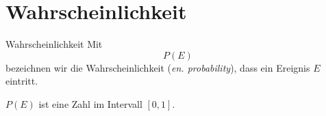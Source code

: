 
\section{Wahrscheinlichkeit}
\begin{definition}{Wahrscheinlichkeit}{}
Mit $$P(E)$$ bezeichnen wir die Wahrscheinlichkeit (\textit{en. probability}), dass ein Ereignis $E$ eintritt.

$P(E)$ ist eine Zahl im Intervall $[0,1]$.
\end{definition}

\newpage








